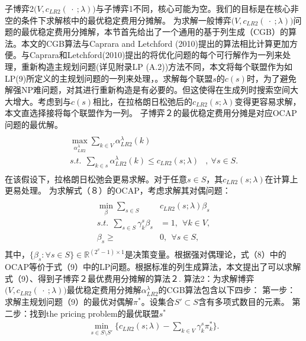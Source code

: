 \documentclass[UTF8]{article}
\newcommand{\R}{\mathbb{R}}
\begin{document}
    子博弈2$\big(V,c_{LR2}(\ \cdot\ ;\lambda)\big)$与子博弈1不同，核心可能为空。我们的目标是在核心非空的条件下求解核中的最优稳定费用分摊解。
为求解一般博弈$\big(V,c_{LR2}(\ \cdot \ ;\lambda)\big)$问题的最优稳定费用分摊解，本节首先给出了一个通用的基于列生成（CGB）的算法。本文的CGB算法与Caprara and Letchford (2010)提出的算法相比计算更加方便。与Caprara和Letchford(2010)提出的将优化问题的每个可行解作为一列来处理，重新构造主规划问题(详见附录LP (A.2))方法不同，本文将每个联盟作为如LP(9)所定义的主规划问题的一列来处理，。求解每个联盟$s$的$c(s)$时，为了避免解强NP难问题，对其进行重新构造是有必要的。但这使得在生成列时搜索空间大大增大。考虑到与$c(s)$相比，在拉格朗日松弛后的$c_{LR2}(s;\lambda)$变得更容易求解，本文直选择接将每个联盟作为一列。
子博弈２的最优稳定费用分摊是对应OCAP问题的最优解。
\begin{eqnarray}\label{eqn:OCAPorg}
\begin{aligned}
\begin{split}
\max_{\alpha_{LR2}^{\lambda}} \sum_{k \in V} \alpha_{LR2}^{\lambda}(k)&\\
s.t.~~ \sum_{k \in s} \alpha_{LR2}^{\lambda}(k) \leq  c_{LR2}(s;\lambda)&,~ \forall s \in S.
\end{split}
\end{aligned}
\end{eqnarray}
在该假设下，拉格朗日松弛会更易求解。对于任意$s \in S$，其$c_{LR2}(s;\lambda)$在计算上更易处理。
为求解式（８）的OCAP，考虑求解其对偶问题：
\begin{eqnarray}\label{eqn:OCAPdual}
\begin{aligned}
\begin{split}
\min_{\beta} \sum_{s \in S} &c_{LR2}(s;\lambda)\beta_{s}\\
s.t.~~\sum_{s \in S} \gamma^s_k\beta_{s}& = 1,~~\forall k \in V,\\
\beta_{s} \geq &0, ~~\forall s \in S,
\end{split}
\end{aligned}
\end{eqnarray}
其中，$\{\beta_s:\forall s\in S \} \in \R^{(2^v-1) \times 1}$是决策变量。根据强对偶理论，式（8）中的OCAP等价于式（9）中的LP问题。根据标准的列生成算法，本文提出了可以求解式（9）、得到子博弈２最优费用分摊解的算法２.
算法2：为求解博弈$\big(V,c_{LR2}(\ \cdot\ ;\lambda)\big)$最优稳定费用分摊解$\alpha_{LR2}^{\lambda}$的CGB算法包含以下四步：
第一步：求解主规划问题（9）的最优对偶解$\pi^{*}$。设集合$S' \subset S$含有多项式数目的元素。
第二步：找到the pricing problem的最优联盟$s^*$
\begin{eqnarray}\label{eqn:pricing}
\min_{s\in S\setminus S'}  \big\{c_{LR2}(s;\lambda) - \sum_{ k \in V} \gamma^s_k \pi_{k}^{*}\big\}.
\end{eqnarray}
\end{document}
